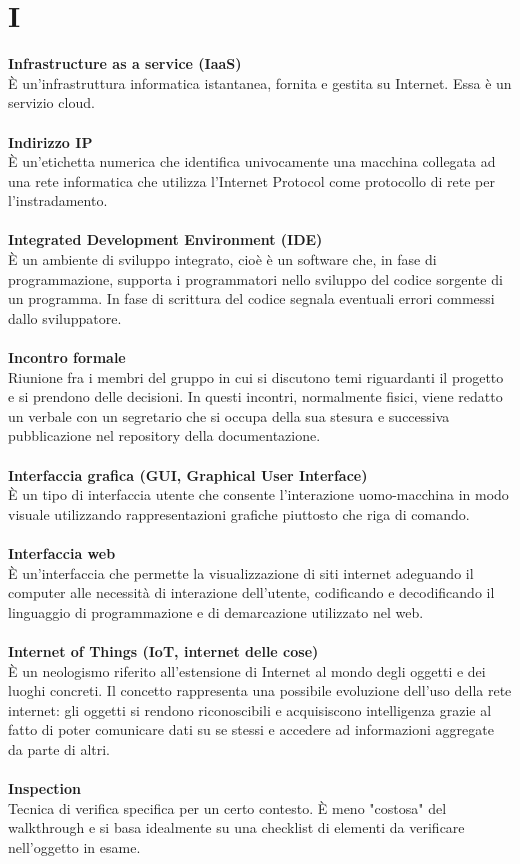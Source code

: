 \section{I}
\textbf{Infrastructure as a service (IaaS)}\\ 
È un'infrastruttura informatica istantanea, fornita e gestita su Internet. Essa è un servizio cloud. \\ \\
\textbf{Indirizzo IP}\\
È un'etichetta numerica che identifica univocamente una macchina collegata ad una rete informatica che utilizza l'Internet Protocol come protocollo di rete per l'instradamento. \\ \\
\textbf{Integrated Development Environment (IDE)}\\
È un ambiente di sviluppo integrato, cioè è un software che, in fase di programmazione, supporta i programmatori nello sviluppo del codice sorgente di un programma. In fase di scrittura del codice segnala eventuali errori commessi dallo sviluppatore. \\ \\
\textbf{Incontro formale}\\
Riunione fra i membri del gruppo in cui si discutono temi riguardanti il progetto e si prendono delle decisioni.
In questi incontri, normalmente fisici, viene redatto un verbale con un segretario che si occupa della sua stesura e successiva pubblicazione nel repository della documentazione. \\ \\
\textbf{Interfaccia grafica (GUI, Graphical User Interface)}\\
È un tipo di interfaccia utente che consente l'interazione uomo-macchina in modo visuale utilizzando rappresentazioni grafiche piuttosto che riga di comando. \\ \\
\textbf{Interfaccia web}\\
È un'interfaccia che permette la visualizzazione di siti internet adeguando il computer alle necessità di interazione dell'utente, codificando e decodificando il linguaggio di programmazione e di demarcazione utilizzato nel web. \\ \\
\textbf{Internet of Things (IoT, internet delle cose)}\\
È un neologismo riferito all'estensione di Internet al mondo degli oggetti e dei luoghi concreti. Il concetto rappresenta una possibile evoluzione dell'uso della rete internet: gli oggetti si rendono riconoscibili e acquisiscono intelligenza grazie al fatto di poter comunicare dati su se stessi e accedere ad informazioni aggregate da parte di altri. \\ \\
\textbf{Inspection}\\
Tecnica di verifica specifica per un certo contesto. È meno "costosa" del walkthrough e si basa idealmente su una checklist di elementi da verificare nell'oggetto in esame.
\clearpage
